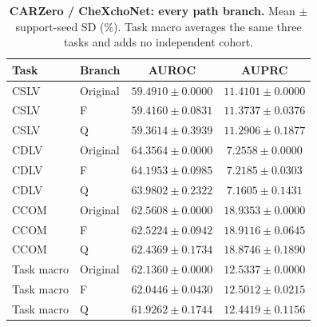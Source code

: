 \begin{table}[tp]
\centering
\caption{\textbf{CARZero / CheXchoNet: every path branch.} Mean $\pm$ support-seed SD (\%). Task macro averages the same three tasks and adds no independent cohort.}
\label{tab:supp-cardiac-path-carzero}
\small
\setlength{\tabcolsep}{4pt}
\begin{tabular*}{\textwidth}{@{\extracolsep{\fill}}llcc@{}}
\toprule
Task & Branch & AUROC & AUPRC \\
\midrule
CSLV & Original & $59.4910\pm0.0000$ & $11.4101\pm0.0000$ \\
CSLV & F & $59.4160\pm0.0831$ & $11.3737\pm0.0376$ \\
CSLV & Q & $59.3614\pm0.3939$ & $11.2906\pm0.1877$ \\
CDLV & Original & $64.3564\pm0.0000$ & $7.2558\pm0.0000$ \\
CDLV & F & $64.1953\pm0.0985$ & $7.2185\pm0.0303$ \\
CDLV & Q & $63.9802\pm0.2322$ & $7.1605\pm0.1431$ \\
CCOM & Original & $62.5608\pm0.0000$ & $18.9353\pm0.0000$ \\
CCOM & F & $62.5224\pm0.0942$ & $18.9116\pm0.0645$ \\
CCOM & Q & $62.4369\pm0.1734$ & $18.8746\pm0.1890$ \\
Task macro & Original & $62.1360\pm0.0000$ & $12.5337\pm0.0000$ \\
Task macro & F & $62.0446\pm0.0430$ & $12.5012\pm0.0215$ \\
Task macro & Q & $61.9262\pm0.1744$ & $12.4419\pm0.1156$ \\
\bottomrule
\end{tabular*}
\end{table}


